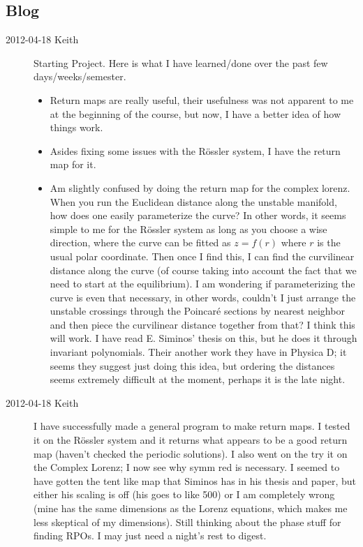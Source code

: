 
\subsection{Blog}
\begin{description}
\item[2012-04-18 Keith] Starting Project.  Here is what I have learned/done over the past few days/weeks/semester.
    \begin{itemize}
    \item Return maps are really useful, their usefulness was not apparent to me at the beginning of the course, but now, I have a better idea of how things work.
    \item Asides fixing some issues with the R\"ossler system, I have the return map for it.
    \item Am slightly confused by doing the return map for the complex lorenz.  When you run the Euclidean distance along the unstable manifold, how does one easily parameterize the curve?  In other words, it seems simple to me for the R\"ossler system as long as you choose a wise direction, where the curve can be fitted as $z = f(r)$ where $r$ is the usual polar coordinate.  Then once I find this, I can find the curvilinear distance along the curve (of course taking into account the fact that we need to start at the equilibrium). I am wondering if parameterizing the curve is even that necessary, in other words, couldn't I just arrange the unstable crossings through the Poincar\'e sections by nearest neighbor and then piece the curvilinear distance together from that?  I think this will work.  I have read E. Siminos' thesis on this, but he does it through invariant polynomials.  Their another work they have in Physica D; it seems they suggest just doing this idea, but ordering the distances seems extremely difficult at the moment, perhaps it is the late night.
        \end{itemize}

\item[2012-04-18 Keith] I have successfully made a general program to make return maps.  I tested it on the R\"ossler system and it returns what appears to be a good return map (haven't checked the periodic solutions).  I also went on the try it on the Complex Lorenz; I now see why symm red is necessary.  I seemed to have gotten the tent like map that Siminos has in his thesis and paper, but either his scaling is off (his goes to like 500) or I am completely wrong (mine has the same dimensions as the Lorenz equations, which makes me less skeptical of my dimensions).  Still thinking about the phase stuff for finding RPOs.  I may just need a night's rest to digest.


\end{description}
